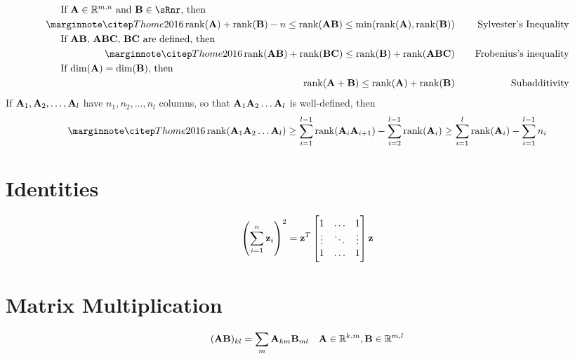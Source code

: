 \begin{align}
\noalign{If $\mA\in\sRmn$ and $\mB\in\sRnr$, then}
\eqcite{Thome2016}
\rank(\mA)+\rank(\mB)-n\le \rank(\mA\mB)\le \min(\rank(\mA),\rank(\mB)) &&~~~~\textrm{Sylvester's Inequality} \\
\noalign{If $\mA\mB$, $\mA\mB\mC$, $\mB\mC$ are defined, then}
\eqcite{Thome2016}
\rank(\mA\mB)+\rank(\mB\mC)\le \rank(\mB)+\rank(\mA\mB\mC) && \textrm{Frobenius's inequality} \\
\noalign{If $\dim(\mA)=\dim(\mB)$, then}
\rank(\mA+\mB)\le\rank(\mA)+\rank(\mB) &&\textrm{Subadditivity}
\end{align}
If $\mathbf{A}_1, \mathbf{A}_2, \ldots, \mathbf{A}_l$ have $n_1,n_2,\ldots,n_l$ columns, so that $\mathbf{A}_1\mathbf{A}_2\ldots\mathbf{A}_l$ is well-defined, then
\begin{equation}
\eqcite{Thome2016}
\rank(\mA_1\mA_2\ldots\mA_l)
\ge \sum_{i=1}^{l-1}\rank(\mA_i\mA_{i+1})-\sum_{i=2}^{l-1}\rank(\mA_i)
\ge\sum_{i=1}^l\rank(\mA_i)-\sum_{i=1}^{l-1}n_i 
\end{equation}

\section{Identities}
\begin{align}
\left(\sum_{i=1}^n \mathbf{z}_i\right)^2 = \mathbf{z}^T
\begin{bmatrix}
1      & \hdots & 1      \\
\vdots & \ddots & \vdots \\
1      & \hdots & 1      
\end{bmatrix}
\mathbf{z}
\end{align}

\section{Matrix Multiplication}

\begin{equation}
(\mathbf{A}\mathbf{B})_{kl} = \sum_m \mathbf{A}_{km}\mathbf{B}_{ml}~~~\mathbf{A}\in\mathbb{R}^{k,m},\mathbf{B}\in\mathbb{R}^{m,l}
\end{equation}


